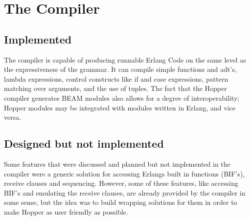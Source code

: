 \section{The Compiler}
\subsection{Implemented}
The compiler is capable of producing runnable Erlang Code on the same level as the expressiveness of the grammar. It can compile simple functions and \Acrshort{adt}'s, lambda expressions, control constructs like if and case expressions, pattern matching over arguments, and the use of tuples. The fact that the Hopper compiler generates BEAM modules also allows for a degree of interoperability; Hopper modules may be integrated with modules written in Erlang, and vice versa.


\subsection{Designed but not implemented}
Some features that were discussed and planned but not implemented in the compiler were a generic solution for accessing Erlangs built in functions (BIF's), receive clauses and sequencing. However, some of these features, like accessing BIF's and emulating the receive clauses, are already provided by the compiler in some sense, but the idea was to build wrapping solutions for them in order to make Hopper as user friendly as possible.